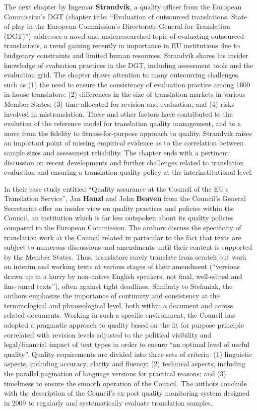 \documentclass[output=paper]{langsci/langscibook}
\begin{document}
The next chapter by Ingemar \textbf{Strandvik}, a quality officer from the European Commission’s DGT (chapter title: “Evaluation of outsourced translations. State of play in the European Commission's Directorate-General for Translation (DGT)”) addresses a novel and underresearched topic of evaluating outsourced translations, a trend gaining recently in importance in EU institutions due to budgetary constraints and limited human resources. Strandvik shares his insider knowledge of evaluation practices in the DGT, including assessment tools and the evaluation grid. The chapter draws attention to many outsourcing challenges, such as (1) the need to ensure the consistency of evaluation practice among 1600 in-house translators; (2) differences in the size of translation markets in various Member States; (3) time allocated for revision and evaluation; and (4) risks involved in mistranslation. These and other factors have contributed to the evolution of the reference model for translation quality management, and to a move from the fidelity to fitness-for-purpose approach to quality. Strandvik raises an important point of missing empirical evidence as to the correlation between sample sizes and assessment reliability. The chapter ends with a pertinent discussion on recent developments and further challenges related to translation evaluation and ensuring a translation quality policy at the interinstitutional level.

In their case study entitled “Quality assurance at the Council of the EU’s Translation Service”, Jan \textbf{Hanzl} and John \textbf{Beaven} from the Council’s General Secretariat offer an insider view on quality practices and policies within the Council, an institution which is far less outspoken about its quality policies compared to the European Commission. The authors discuss the specificity of translation work at the Council related in particular to the fact that texts are subject to numerous discussions and amendments until their content is supported by the Member States. Thus, translators rarely translate from scratch but work on interim and working texts at various stages of their amendment (“versions drawn up in a hurry by non-native English speakers, not final, well-edited and fine-tuned texts”), often against tight deadlines. Similarly to Stefaniak, the authors emphasize the importance of continuity and consistency at the terminological and phraseological level, both within a document and across related documents. Working in such a specific environment, the Council has adopted a pragmatic approach to quality based on the fit for purpose principle correlated with revision levels adjusted to the political visibility and legal/financial impact of text types in order to ensure “an optimal level of useful quality”. Quality requirements are divided into three sets of criteria: (1) linguistic aspects, including accuracy, clarity and fluency; (2) technical aspects, including the parallel pagination of language versions for practical reasons; and (3) timeliness to ensure the smooth operation of the Council. The authors conclude with the description of the Council’s ex-post quality monitoring system designed in 2009 to regularly and systematically evaluate translation samples.
\end{document}

